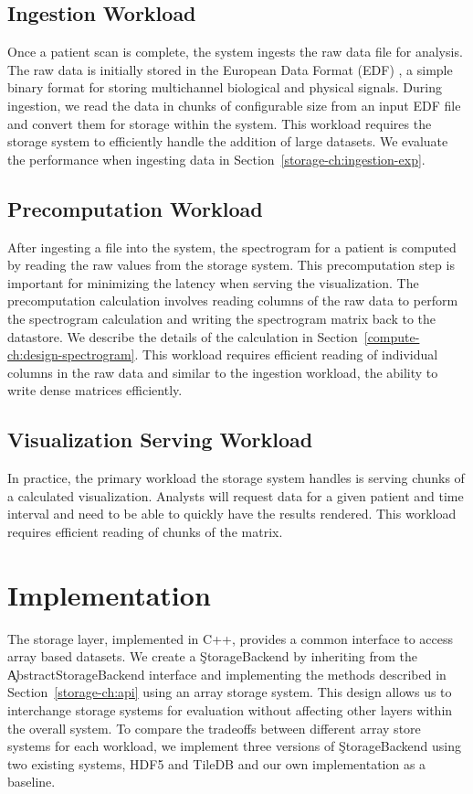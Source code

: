 \subsection{Ingestion Workload}

Once a patient scan is complete, the system ingests the raw data file for
analysis. The raw data is initially stored in the European Data Format (EDF)
\cite{edf}, a simple binary format for storing multichannel biological and
physical signals. During ingestion, we read the data in chunks of configurable
size from an input EDF file and convert them for storage within the system.
This workload requires the storage system to efficiently handle the addition of
large datasets. We evaluate the performance when ingesting data in
Section~\ref{storage-ch:ingestion-exp}.

\subsection{Precomputation Workload}

After ingesting a file into the system, the spectrogram for a patient is
computed by reading the raw values from the storage system. This precomputation
step is important for minimizing the latency when serving the visualization.
The precomputation calculation involves reading columns of the raw data to
perform the spectrogram calculation and writing the spectrogram matrix back to
the datastore. We describe the details of the calculation in
Section~\ref{compute-ch:design-spectrogram}. This workload requires efficient
reading of individual columns in the raw data and similar to the ingestion
workload, the ability to write dense matrices efficiently.

\subsection{Visualization Serving Workload}

In practice, the primary workload the storage system handles is serving
chunks of a calculated visualization. Analysts will request data for a given
patient and time interval and need to be able to quickly have the results
rendered. This workload requires efficient reading of chunks of the matrix.

\section{Implementation}

The storage layer, implemented in C++, provides a common interface to access
array based datasets. We create a \c{StorageBackend} by inheriting from the
\c{AbstractStorageBackend} interface and implementing the methods described in
Section~\ref{storage-ch:api} using an array storage system. This design allows
us to interchange storage systems for evaluation without affecting other layers
within the overall system. To compare the tradeoffs between different array
store systems for each workload, we implement three versions of
\c{StorageBackend} using two existing systems, HDF5 \cite{hdf5} and TileDB
\cite{tiledb} and our own implementation as a baseline. \\

